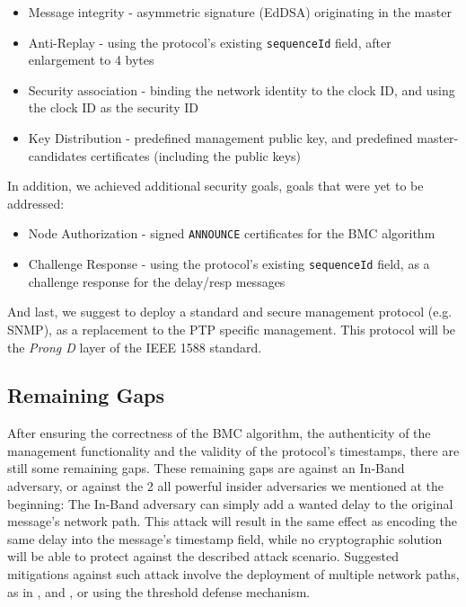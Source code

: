 \documentclass[11pt]{article}
\begin{document}
\begin{itemize}

  \item Message integrity - asymmetric signature (EdDSA) originating in the master

  \item Anti-Replay - using the protocol's existing \texttt{sequenceId} field, after enlargement to 4 bytes

  \item Security association - binding the network identity to the clock ID, and using the clock ID as the security ID

  \item Key Distribution - predefined management public key, and predefined master-candidates certificates (including the public keys)

\end{itemize}



In addition, we achieved additional security goals, goals that were yet to be addressed:

\begin{itemize}

  \item Node Authorization - signed \texttt{ANNOUNCE} certificates for the BMC algorithm

  \item Challenge Response - using the protocol's existing \texttt{sequenceId} field, as a challenge response for the delay/resp messages

\end{itemize}

And last, we suggest to deploy a standard and secure management protocol (e.g. SNMP), as a replacement to the PTP specific management. This protocol will be the \emph{Prong D} layer of the IEEE 1588 standard.



\subsection{Remaining Gaps}\label{sol:gaps}

After ensuring the correctness of the BMC algorithm, the authenticity of the management functionality and the validity of the protocol's timestamps, there are still some remaining gaps. These remaining gaps are against an In-Band adversary, or against the 2 all powerful insider adversaries we mentioned at the beginning: The In-Band adversary can simply add a wanted delay to the original message's network path. This attack will result in the same effect as encoding the same delay into the message's timestamp field, while no cryptographic solution will be able to protect against the described attack scenario. Suggested mitigations against such attack involve the deployment of multiple network paths, as in \cite{duplicate_PTP}, \cite{multiple_paths} and \cite{byzantine}, or using the threshold defense mechanism.
\end{document}
